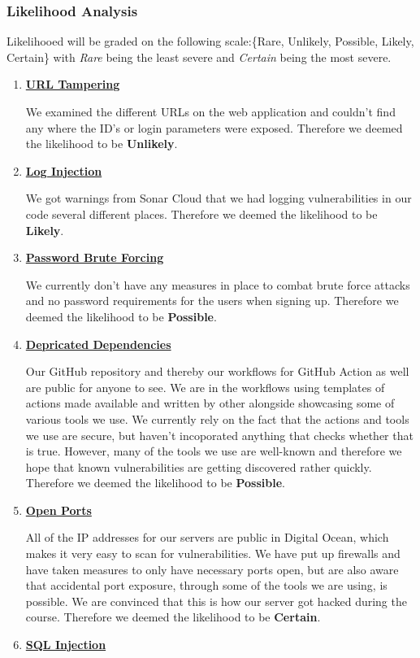 \subsubsection{Likelihood Analysis}
Likelihooed will be graded on the following scale:\{Rare, Unlikely, Possible, Likely, Certain\} with \textit{Rare} being the least severe and \textit{Certain} being the most severe.
\begin{enumerate}
    \item \textbf{\underline{URL Tampering}}

    We examined the different URLs on the web application and couldn't find any where the ID's or login parameters were exposed. Therefore we deemed the likelihood to be \textbf{Unlikely}.
    \item \textbf{\underline{Log Injection}}

    We got warnings from Sonar Cloud that we had logging vulnerabilities in our code several different places. Therefore we deemed the likelihood to be \textbf{Likely}.

    \item \textbf{\underline{Password Brute Forcing}}

    We currently don't have any measures in place to combat brute force attacks and no password requirements for the users when signing up. Therefore we deemed the likelihood to be \textbf{Possible}.
    \item \textbf{\underline{Depricated Dependencies}}

    Our GitHub repository and thereby our workflows for GitHub Action as well are public for anyone to see. We are in the workflows using templates of actions made available and written by other alongside showcasing some of various tools we use. We currently rely on the fact that the actions and tools we use are secure, but haven't incoporated anything that checks whether that is true. However, many of the tools we use are well-known and therefore we hope that known vulnerabilities are getting discovered rather quickly. Therefore we deemed the likelihood to be \textbf{Possible}.
    \item \textbf{\underline{Open Ports}}

    All of the IP addresses for our servers are public in Digital Ocean, which makes it very easy to scan for vulnerabilities. We have put up firewalls and have taken measures to only have necessary ports open, but are also aware that accidental port exposure, through some of the tools we are using, is possible. We are convinced that this is how our server got hacked during the course. Therefore we deemed the likelihood to be \textbf{Certain}.
    \item \textbf{\underline{SQL Injection}}


\end{enumerate}
